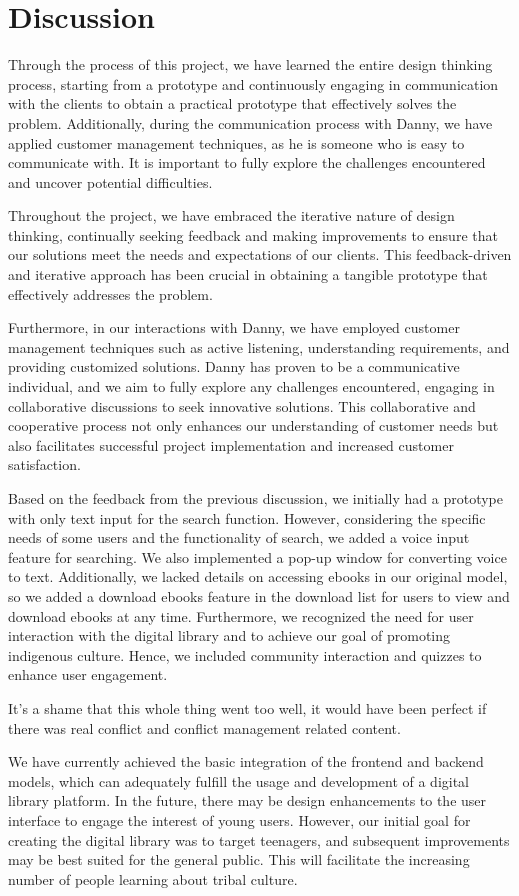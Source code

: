 \chapter{Discussion}

Through the process of this project, we have learned the entire design thinking process, starting from a prototype and continuously engaging in communication with the clients to obtain a practical prototype that effectively solves the problem. Additionally, during the communication process with Danny, we have applied customer management techniques, as he is someone who is easy to communicate with. It is important to fully explore the challenges encountered and uncover potential difficulties.

Throughout the project, we have embraced the iterative nature of design thinking, continually seeking feedback and making improvements to ensure that our solutions meet the needs and expectations of our clients. This feedback-driven and iterative approach has been crucial in obtaining a tangible prototype that effectively addresses the problem.

Furthermore, in our interactions with Danny, we have employed customer management techniques such as active listening, understanding requirements, and providing customized solutions. Danny has proven to be a communicative individual, and we aim to fully explore any challenges encountered, engaging in collaborative discussions to seek innovative solutions. This collaborative and cooperative process not only enhances our understanding of customer needs but also facilitates successful project implementation and increased customer satisfaction.

Based on the feedback from the previous discussion, we initially had a prototype with only text input for the search function. However, considering the specific needs of some users and the functionality of search, we added a voice input feature for searching. We also implemented a pop-up window for converting voice to text. Additionally, we lacked details on accessing ebooks in our original model, so we added a download ebooks feature in the download list for users to view and download ebooks at any time. Furthermore, we recognized the need for user interaction with the digital library and to achieve our goal of promoting indigenous culture. Hence, we included community interaction and quizzes to enhance user engagement.

It's a shame that this whole thing went too well, it would have been perfect if there was real conflict and conflict management related content.

We have currently achieved the basic integration of the frontend and backend models, which can adequately fulfill the usage and development of a digital library platform. In the future, there may be design enhancements to the user interface to engage the interest of young users. However, our initial goal for creating the digital library was to target teenagers, and subsequent improvements may be best suited for the general public. This will facilitate the increasing number of people learning about tribal culture.
